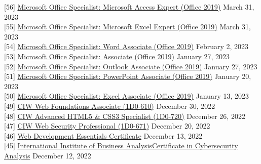 \documentclass[10pt]{res} %
\begin{document}
\begin{resume}
{[56]} \phantom{0}\href{https://www.credly.com/badges/e7236f9d-3666-412e-a777-4b16071c1e0c}{\color{blue}Microsoft Office Specialist: Microsoft Access Expert (Office 2019)} \hfill March 31, 2023 \\
{[55]} \phantom{0}\href{https://www.credly.com/badges/30418a7c-eff2-45c8-a160-8d946f692419}{\color{blue}Microsoft Office Specialist: Microsoft Excel Expert (Office 2019)} \hfill March 31, 2023 \\
{[54]} \phantom{0}\href{https://www.credly.com/badges/5d6179b7-801a-4aee-89c3-48f490a3c490}{\color{blue}Microsoft Office Specialist: Word Associate (Office 2019)} \hfill February 2, 2023 \\
{[53]} \phantom{0}\href{https://www.credly.com/badges/ce4ab6c1-b43a-492d-a10c-fa778e165bff}{\color{blue}Microsoft Office Specialist: Associate (Office 2019)} \hfill January 27, 2023 \\
{[52]} \phantom{0}\href{https://www.credly.com/badges/bb4806cf-46b9-4e7f-9a77-2be83fdf5e47}{\color{blue}Microsoft Office Specialist: Outlook Associate (Office 2019)} \hfill January 27, 2023 \\
{[51]} \phantom{0}\href{https://www.credly.com/badges/65688d2c-6938-423d-922c-f01bdd9b1b3b}{\color{blue}Microsoft Office Specialist: PowerPoint Associate (Office 2019)} \hfill January 20, 2023 \\
{[50]} \phantom{0}\href{https://www.credly.com/badges/05caf753-8ff0-4613-8136-1b2942aa8114}{\color{blue}Microsoft Office Specialist: Excel Associate (Office 2019)} \hfill January 13, 2023 \\
{[49]} \phantom{0}\href{https://cp.certmetrics.com/ciwcerts/en/public/transcript/b3272f18dc304fbab913c7719bcc7e99}{\color{blue}CIW Web Foundations Associate (1D0-610)} \hfill December 30, 2022 \\
{[48]} \phantom{0}\href{https://cp.certmetrics.com/ciwcerts/en/public/transcript/b3272f18dc304fbab913c7719bcc7e99}{\color{blue}CIW Advanced HTML5 \& CSS3 Specialist (1D0-720)} \hfill December 26, 2022 \\
{[47]} \phantom{0}\href{https://cp.certmetrics.com/ciwcerts/en/public/transcript/b3272f18dc304fbab913c7719bcc7e99}{\color{blue}CIW Web Security Professional (1D0-671)} \hfill December 20, 2022 \\
{[46]} \phantom{0}\href{https://www.credly.com/badges/e13dff51-68b7-41c8-af16-e51ca31c31f3}{\color{blue}Web Development Essentials Certificate} \hfill December 13, 2022 \\
{[45]} \phantom{0}\href{https://badges.iiba.org/d0852eda-2bc6-46a6-b7cb-ff8e8cdf47ac}{\color{blue}International Institute of Business Analysis\texttrademark\phantom{0}Certificate in Cybersecurity Analysis} \hfill December 12, 2022 \\

\end{resume}
\end{document}
